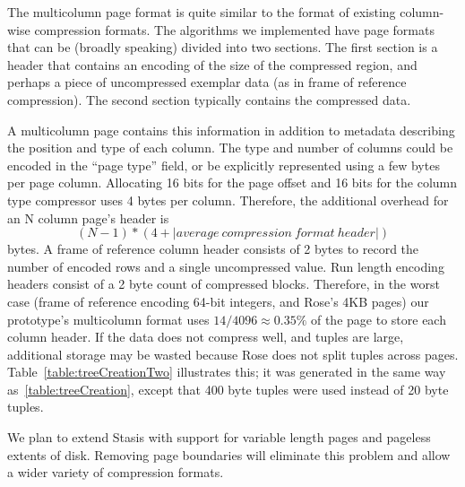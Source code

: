 \documentclass{vldb}
\newcommand{\rows}{Rose\xspace}
\newcommand{\rowss}{Rose's\xspace}
\begin{document}
The multicolumn page format is quite similar to the format of existing
column-wise compression formats.  The algorithms we implemented have
page formats that can be (broadly speaking) divided into two sections.
The first section is a header that contains an encoding of the size of
the compressed region, and perhaps a piece of uncompressed exemplar
data (as in frame of reference compression).  The second section
typically contains the compressed data.

A multicolumn page contains this information in addition to metadata
describing the position and type of each column.  The type and number
of columns could be encoded in the ``page type'' field, or be
explicitly represented using a few bytes per page column.  Allocating
16 bits for the page offset and 16 bits for the column type compressor
uses 4 bytes per column.  Therefore, the additional overhead for an N
column page's header is
\[
   (N-1) * (4 + |average~compression~format~header|)
\]
bytes.  A frame of reference column header consists of 2 bytes to
record the number of encoded rows and a single uncompressed
value. Run length encoding headers consist of a 2 byte count of
compressed blocks.  Therefore, in the worst case (frame of reference
encoding 64-bit integers, and \rowss 4KB pages) our prototype's
multicolumn format uses $14/4096\approx0.35\%$ of the page to store
each column header.  If the data does not compress well, and tuples
are large, additional storage may be wasted because \rows does not
split tuples across pages.  Table~\ref{table:treeCreationTwo}
illustrates this; it was generated in the same way
as~\ref{table:treeCreation}, except that 400 byte tuples were 
used instead of 20 byte tuples.

We plan to extend Stasis with support for variable length pages and
pageless extents of disk.  Removing page boundaries will eliminate
this problem and allow a wider variety of compression formats.


\end{document}
